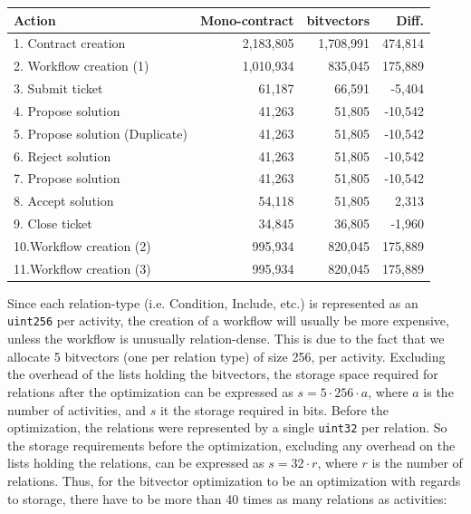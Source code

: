 \documentclass{article}
\begin{document}
		\begin{table}
		\label{table:test-cases-bitvectors}
			\begin{tabular}{| p{5cm} | r | r | r |}
				\hline
				Action 							& Mono-contract  	& bitvectors 	& Diff.		\\\hline
				1. Contract creation			& 2,183,805		 	& 1,708,991 	& 474,814	\\\hline
				2. Workflow creation (1)		& 1,010,934 		& 835,045 		& 175,889	\\\hline
				3. Submit ticket				& 61,187			& 66,591		& -5,404	\\\hline
				4. Propose solution				& 41,263 		 	& 51,805		& -10,542	\\\hline
				5. Propose solution (Duplicate)	& 41,263 		 	& 51,805		& -10,542	\\\hline
				6. Reject solution				& 41,263 		 	& 51,805		& -10,542	\\\hline
				7. Propose solution				& 41,263 		 	& 51,805		& -10,542	\\\hline
				8. Accept solution				& 54,118 		 	& 51,805		& 2,313		\\\hline
				9. Close ticket					& 34,845 		 	& 36,805		& -1,960	\\\hline
				10.Workflow creation (2)		& 995,934 		 	& 820,045		& 175,889	\\\hline
				11.Workflow creation (3)		& 995,934 		 	& 820,045		& 175,889 	\\\hline
			\end{tabular}
		\end{table}
		\FloatBarrier

		Since each relation-type (i.e. Condition, Include, etc.) is represented as an \texttt{uint256} per activity, the creation of a workflow will usually be more expensive, unless the workflow is unusually relation-dense. 
		This is due to the fact that we allocate 5 bitvectors (one per relation type) of size 256, per activity. 
		Excluding the overhead of the lists holding the bitvectors, the storage space required for relations after the optimization can be expressed as $s = 5 \cdot 256 \cdot a$, where $a$ is the number of activities, and $s$ it the storage required in bits.
		Before the optimization, the relations were represented by a single \texttt{uint32} per relation.
		So the storage requirements before the optimization, excluding any overhead on the lists holding the relations, can be expressed as $s = 32 \cdot r$, where $r$ is the number of relations.
		Thus, for the bitvector optimization to be an optimization with regards to storage, there have to be more than 40 times as many relations as activities:
\end{document}
